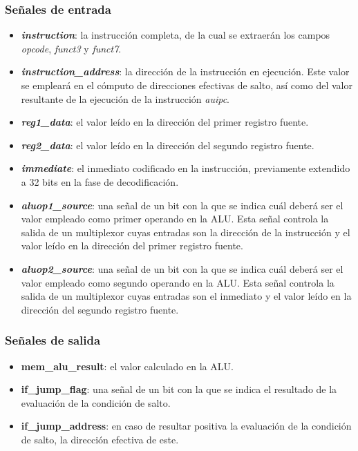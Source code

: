 \subsubsection{Señales de entrada}

\begin{itemize}
  \item \textbf{\textit{instruction}}: la instrucción completa, de la cual se extraerán los campos \textit{opcode}, \textit{funct3} y \textit{funct7}.
  \item \textbf{\textit{instruction\_address}}: la dirección de la instrucción en ejecución. Este valor se empleará en el cómputo de direcciones efectivas de salto, así como del valor resultante de la ejecución de la instrucción \textit{auipc}.
  \item \textbf{\textit{reg1\_data}}: el valor leído en la dirección del primer registro fuente.
  \item \textbf{\textit{reg2\_data}}: el valor leído en la dirección del segundo registro fuente.
  \item \textbf{\textit{immediate}}: el inmediato codificado en la instrucción, previamente extendido a 32 bits en la fase de decodificación.
  \item \textbf{\textit{aluop1\_source}}: una señal de un bit con la que se indica cuál deberá ser el valor empleado como primer operando en la ALU. Esta señal controla la salida de un multiplexor cuyas entradas son la dirección de la instrucción y el valor leído en la dirección del primer registro fuente.
  \item \textbf{\textit{aluop2\_source}}: una señal de un bit con la que se indica cuál deberá ser el valor empleado como segundo operando en la ALU. Esta señal controla la salida de un multiplexor cuyas entradas son el inmediato y el valor leído en la dirección del segundo registro fuente.
\end{itemize}

\subsubsection{Señales de salida}

\begin{itemize}
  \item \textbf{mem\_alu\_result}: el valor calculado en la ALU.
  \item \textbf{if\_jump\_flag}: una señal de un bit con la que se indica el resultado de la evaluación de la condición de salto.
  \item \textbf{if\_jump\_address}: en caso de resultar positiva la evaluación de la condición de salto, la dirección efectiva de este.
\end{itemize}

